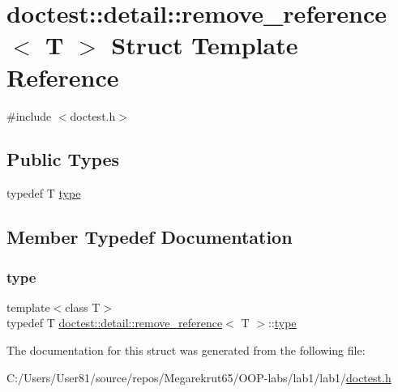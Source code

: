 \hypertarget{structdoctest_1_1detail_1_1remove__reference}{}\section{doctest\+:\+:detail\+:\+:remove\+\_\+reference$<$ T $>$ Struct Template Reference}
\label{structdoctest_1_1detail_1_1remove__reference}


{\ttfamily \#include $<$doctest.\+h$>$}

\subsection*{Public Types}
\begin{DoxyCompactItemize}
\item 
typedef T \mbox{\hyperlink{structdoctest_1_1detail_1_1remove__reference_ab3cba0e8bc4c71b7f4ecdf85476ec4cc}{type}}
\end{DoxyCompactItemize}


\subsection{Member Typedef Documentation}
\mbox{\label{structdoctest_1_1detail_1_1remove__reference_ab3cba0e8bc4c71b7f4ecdf85476ec4cc}} 
\subsubsection{\texorpdfstring{type}{type}}
{\footnotesize\ttfamily template$<$class T$>$ \\
typedef T \mbox{\hyperlink{structdoctest_1_1detail_1_1remove__reference}{doctest\+::detail\+::remove\+\_\+reference}}$<$ T $>$\+::\mbox{\hyperlink{structdoctest_1_1detail_1_1remove__reference_ab3cba0e8bc4c71b7f4ecdf85476ec4cc}{type}}}



The documentation for this struct was generated from the following file\+:\begin{DoxyCompactItemize}
\item 
C\+:/\+Users/\+User81/source/repos/\+Megarekrut65/\+O\+O\+P-\/labs/lab1/lab1/\mbox{\hyperlink{doctest_8h}{doctest.\+h}}\end{DoxyCompactItemize}
